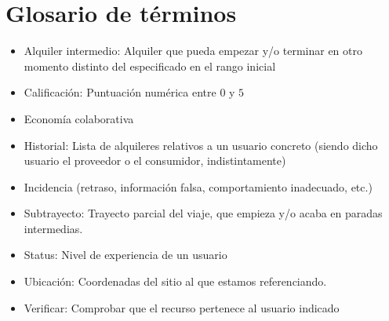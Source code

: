 \documentclass[11pt,spanish]{article} %
\begin{document}
\section{Glosario de términos}
\begin{itemize}
	\item Alquiler intermedio: Alquiler que pueda empezar y/o terminar en otro momento distinto del especificado en el rango inicial
	\item Calificación: Puntuación numérica entre $0$ y $5$
	\item Economía colaborativa
	\item Historial: Lista de alquileres relativos a un usuario concreto (siendo dicho usuario el proveedor o el consumidor, indistintamente)
	\item Incidencia (retraso, información falsa, comportamiento inadecuado, etc.)
	\item Subtrayecto: Trayecto parcial del viaje, que empieza y/o acaba en paradas intermedias.
	\item Status: Nivel de experiencia de un usuario
	\item Ubicación: Coordenadas del sitio al que estamos referenciando.
	\item Verificar: Comprobar que el recurso pertenece al usuario indicado	
\end{itemize}







  

  
\end{document}
